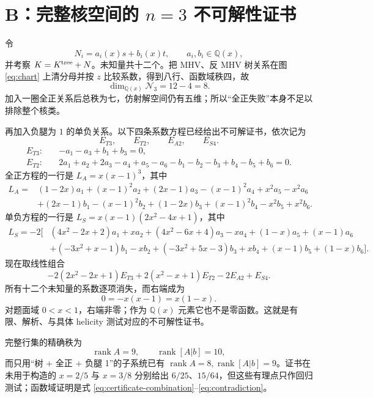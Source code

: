 \documentclass[11pt,a4paper,UTF8]{ctexart}
\newcommand{\cN}{\mathcal N}
\newcommand{\rank}{\operatorname{rank}}
\newcommand{\Qx}{\mathbb Q(x)}
\begin{document}
\section{B：完整核空间的 $n=3$ 不可解性证书}

令
\begin{equation}
N_i=a_i(x)s+b_i(x)t,\qquad a_i,b_i\in\Qx,
\label{eq:null-ansatz}
\end{equation}
并考察 $K=K^{\rm tree}+N$。未知量共十二个。把 MHV、反 MHV 树关系在图 \eqref{eq:chart} 上清分母并按 $z$ 比较系数，得到八行、函数域秩四，故
\begin{equation}
\dim_{\Qx}\cN_3=12-4=8.
\end{equation}
加入一圈全正关系后总秩为七，仿射解空间仍有五维；所以“全正失败”本身不足以排除整个核类。

再加入负腿为 $1$ 的单负关系。以下四条系数方程已经给出不可解证书，依次记为
\[
E_{T3},\qquad E_{T2},\qquad E_{A2},\qquad E_{S4}.
\]
\begin{align}
E_{T3}:\quad
&-a_1-a_3+b_1+b_3=0,\label{eq:ET3}\\
E_{T2}:\quad
&2a_1+a_2+2a_3-a_4+a_5-a_6
-b_1-b_2-b_3+b_4-b_5+b_6=0.\label{eq:ET2}
\end{align}
全正方程的一行是 $L_A=x(x-1)^3$，其中
\begin{align}
L_A={}&(1-2x)a_1+(x-1)^2a_2+(2x-1)a_3-(x-1)^2a_4+x^2a_5-x^2a_6\nonumber\\
&+(2x-1)b_1-(x-1)^2b_2+(1-2x)b_3+(x-1)^2b_4-x^2b_5+x^2b_6.
\label{eq:EA2}
\end{align}
单负方程的一行是 $L_S=x(x-1)(2x^2-4x+1)$，其中
\begin{align}
L_S=-2\big[{}&(4x^2-2x+2)a_1+xa_2+(4x^2-6x+4)a_3-xa_4
+(1-x)a_5+(x-1)a_6\nonumber\\
&+(-3x^2+x-1)b_1-xb_2+(-3x^2+5x-3)b_3+xb_4
+(x-1)b_5+(1-x)b_6\big].
\label{eq:ES4}
\end{align}
现在取线性组合
\begin{equation}
-2(2x^2-2x+1)E_{T3}
+2(x^2-x+1)E_{T2}
-2E_{A2}+E_{S4}.
\label{eq:certificate-combination}
\end{equation}
所有十二个未知量的系数逐项消失，而右端成为
\begin{equation}
0=-x(x-1)=x(1-x).
\label{eq:contradiction}
\end{equation}
对题面域 $0<x<1$，右端非零；作为 $\Qx$ 元素它也不是零函数。这就是有限、解析、与具体 helicity 测试对应的不可解性证书。

完整行集的精确秩为
\begin{equation}
\rank A=9,
\qquad
\rank[A|b]=10,
\end{equation}
而只用“树 $+$ 全正 $+$ 负腿 1”的子系统已有
$\rank A=8,\rank[A|b]=9$。证书在未用于构造的
$x=2/5$ 与 $x=3/8$ 分别给出 $6/25$、$15/64$，但这些有理点只作回归测试；函数域证明是式 \eqref{eq:certificate-combination}--\eqref{eq:contradiction}。
\end{document}
